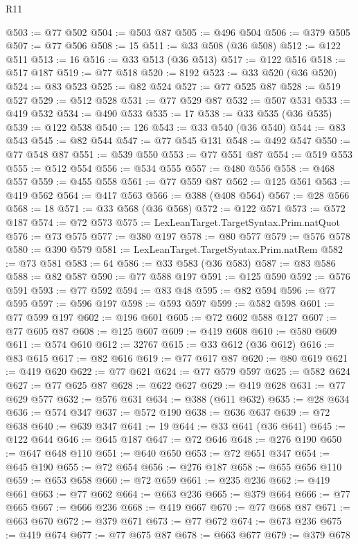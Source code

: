 \begin{lexlean}{R11}
\begin{coremodule}
@503 := @77 @502
@504 := @503 @87
@505 := @496 @504
@506 := @379 @505
@507 := @77 @506
@508 := 15
@511 := @33 @508 (@36 @508)
@512 := @122 @511
@513 := 16
@516 := @33 @513 (@36 @513)
@517 := @122 @516
@518 := @517 @187
@519 := @77 @518
@520 := 8192
@523 := @33 @520 (@36 @520)
@524 := @83 @523
@525 := @82 @524
@527 := @77 @525 @87
@528 := @519 @527
@529 := @512 @528
@531 := @77 @529 @87
@532 := @507 @531
@533 := @419 @532
@534 := @490 @533
@535 := 17
@538 := @33 @535 (@36 @535)
@539 := @122 @538
@540 := 126
@543 := @33 @540 (@36 @540)
@544 := @83 @543
@545 := @82 @544
@547 := @77 @545 @131
@548 := @492 @547
@550 := @77 @548 @87
@551 := @539 @550
@553 := @77 @551 @87
@554 := @519 @553
@555 := @512 @554
@556 := @534 @555
@557 := @480 @556
@558 := @468 @557
@559 := @455 @558
@561 := @77 @559 @87
@562 := @125 @561
@563 := @419 @562
@564 := @417 @563
@566 := @388 (@408 @564)
@567 := @28 @566
@568 := 18
@571 := @33 @568 (@36 @568)
@572 := @122 @571
@573 := @572 @187
@574 := @72 @573
@575 := LexLeanTarget.TargetSyntax.Prim.natQuot
@576 := @73 @575
@577 := @380 @197
@578 := @80 @577
@579 := @576 @578
@580 := @390 @579
@581 := LexLeanTarget.TargetSyntax.Prim.natRem
@582 := @73 @581
@583 := 64
@586 := @33 @583 (@36 @583)
@587 := @83 @586
@588 := @82 @587
@590 := @77 @588 @197
@591 := @125 @590
@592 := @576 @591
@593 := @77 @592
@594 := @83 @48
@595 := @82 @594
@596 := @77 @595
@597 := @596 @197
@598 := @593 @597
@599 := @582 @598
@601 := @77 @599 @197
@602 := @196 @601
@605 := @72 @602 @588 @127
@607 := @77 @605 @87
@608 := @125 @607
@609 := @419 @608
@610 := @580 @609
@611 := @574 @610
@612 := 32767
@615 := @33 @612 (@36 @612)
@616 := @83 @615
@617 := @82 @616
@619 := @77 @617 @87
@620 := @80 @619
@621 := @419 @620
@622 := @77 @621
@624 := @77 @579 @597
@625 := @582 @624
@627 := @77 @625 @87
@628 := @622 @627
@629 := @419 @628
@631 := @77 @629 @577
@632 := @576 @631
@634 := @388 (@611 @632)
@635 := @28 @634
@636 := @574 @347
@637 := @572 @190
@638 := @636 @637
@639 := @72 @638
@640 := @639 @347
@641 := 19
@644 := @33 @641 (@36 @641)
@645 := @122 @644
@646 := @645 @187
@647 := @72 @646
@648 := @276 @190
@650 := @647 @648 @110
@651 := @640 @650
@653 := @72 @651 @347
@654 := @645 @190
@655 := @72 @654
@656 := @276 @187
@658 := @655 @656 @110
@659 := @653 @658
@660 := @72 @659
@661 := @235 @236
@662 := @419 @661
@663 := @77 @662
@664 := @663 @236
@665 := @379 @664
@666 := @77 @665
@667 := @666 @236
@668 := @419 @667
@670 := @77 @668 @87
@671 := @663 @670
@672 := @379 @671
@673 := @77 @672
@674 := @673 @236
@675 := @419 @674
@677 := @77 @675 @87
@678 := @663 @677
@679 := @379 @678

\end{coremodule}
\end{lexlean}
